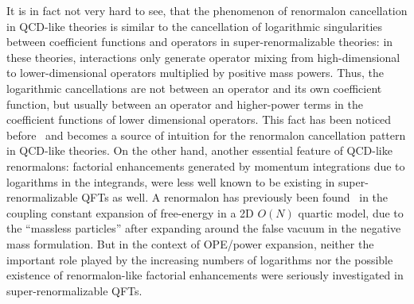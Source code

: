 \documentclass[a4paper,11pt]{article}
\begin{document}
It is in fact not very hard to see, that the phenomenon of renormalon cancellation in QCD-like theories is similar to the cancellation of logarithmic singularities between coefficient functions and operators in super-renormalizable theories: in these theories, interactions only generate operator mixing from high-dimensional to lower-dimensional operators multiplied by positive mass powers. Thus, the logarithmic cancellations are not between an operator and its own coefficient function, but usually between an operator and higher-power terms in the coefficient functions of lower dimensional operators. This fact has been noticed before~\cite{Novikov:1984rf} and becomes a source of intuition for the renormalon cancellation pattern in QCD-like theories. On the other hand, another essential feature of QCD-like renormalons: factorial enhancements generated by momentum integrations due to logarithms in the integrands, were less well known to be existing in super-renormalizable QFTs as well.  A renormalon has previously been found~\cite{Marino:2019fvu} in the coupling constant expansion of free-energy in a 2D $O(N)$ quartic model, due to the ``massless particles'' after expanding around the false vacuum in the negative mass formulation. But in the context of OPE/power expansion,  neither the important role played by the increasing numbers of logarithms nor the possible existence of renormalon-like factorial enhancements were seriously investigated in super-renormalizable QFTs.  
\end{document}
